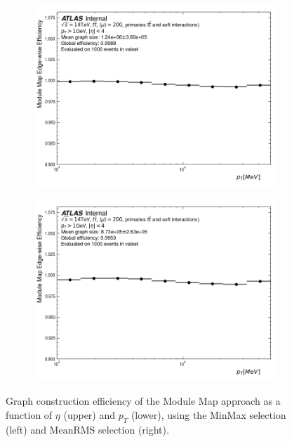 \begin{figure}[h!]
\begin{subfigure}[b]{0.49\textwidth}
    \centering
    \includegraphics[width=\textwidth]{figures/gnn_MM_UNCLEANED_MINMAX_WITHOUT_CONCAT_LATENT128_LN/graph_construction_edgewise_efficiency_pt.png}
    \caption{}
    \label{subfig:mm-eff-minmax-pt}
\end{subfigure}
\begin{subfigure}[b]{0.49\textwidth}
    \centering
    \includegraphics[width=\textwidth]{figures/gnn_MM_UNCLEANED_MEANRMS_WITHOUT_CONCAT_LATENT128_LN/graph_construction_edgewise_efficiency_pt.png}
    \caption{}
    \label{subfig:mm-eff-meanrms-pt}
\end{subfigure}
    \caption{Graph construction efficiency of the Module Map approach as a function of $\eta$ (upper) and $p_T$ (lower), using the MinMax selection (left) and MeanRMS selection (right). }
    \label{fig:mm-eff}
\end{figure}

